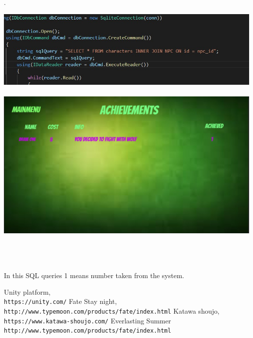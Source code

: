 \documentclass[12pt,a4paper]{article}
\newcommand{\ind}{\indent\indent}
\begin{document}
\newpage
\ind{}.\\
\begin{center}
\includegraphics[scale=0.8]{images/TESTING/QUERY5.jpg} \\
\ind\\
\includegraphics[scale=0.6]{images/TESTING/Achievements.jpg} 
\end{center}
\ind\\
\ind\\
\ind\\ In this SQL queries 1 means number taken from the system.
\newpage
\begin{thebibliography}{9}
Unity platform,
\\\texttt{https://unity.com/}
Fate Stay night,
\\\texttt{http://www.typemoon.com/products/fate/index.html}
Katawa shoujo,
\\\texttt{https://www.katawa-shoujo.com/}
Everlasting Summer
\\\texttt{http://www.typemoon.com/products/fate/index.html}
\end{thebibliography}
\end{document}

